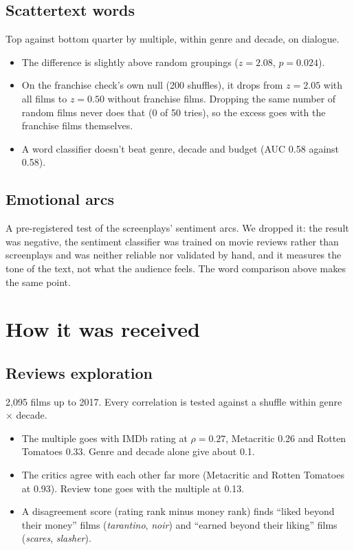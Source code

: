 \documentclass[10pt]{article}
\begin{document}
\subsection{Scattertext words }
Top against bottom quarter by multiple, within genre and decade, on dialogue.
\begin{itemize}
  \item The difference is slightly above random groupings ($z = 2.08$, $p = 0.024$).
  \item On the franchise check's own null (200 shuffles), it drops from $z = 2.05$ with all films to $z = 0.50$ without franchise films. Dropping the same number of random films never does that (0 of 50 tries), so the excess goes with the franchise films themselves.
  \item A word classifier doesn't beat genre, decade and budget (AUC 0.58 against 0.58).
\end{itemize}

\subsection{Emotional arcs }
A pre-registered test of the screenplays' sentiment arcs. We dropped it: the result was negative, the sentiment
classifier was trained on movie reviews rather than screenplays and was neither reliable nor validated by hand,
and it measures the tone of the text, not what the audience feels. The word comparison above makes the same point.

\section{How it was received}

\subsection{Reviews exploration }
2,095 films up to 2017. Every correlation is tested against a shuffle within genre $\times$ decade.
\begin{itemize}
  \item The multiple goes with IMDb rating at $\rho = 0.27$, Metacritic 0.26 and Rotten Tomatoes 0.33. Genre and decade alone give about 0.1.
  \item The critics agree with each other far more (Metacritic and Rotten Tomatoes at 0.93). Review tone goes with the multiple at 0.13.
  \item A disagreement score (rating rank minus money rank) finds ``liked beyond their money'' films (\textit{tarantino}, \textit{noir}) and ``earned beyond their liking'' films (\textit{scares}, \textit{slasher}).
\end{itemize}
\end{document}
